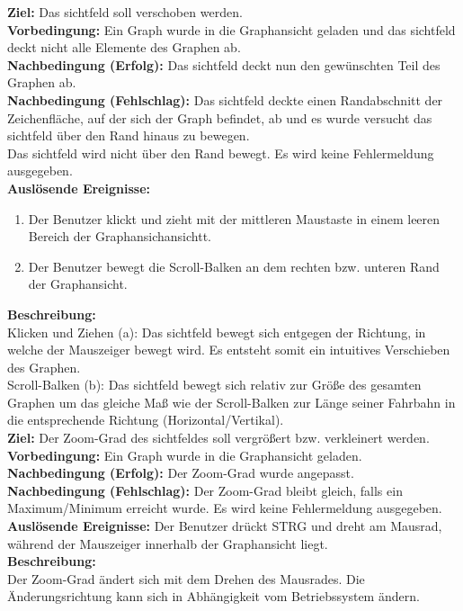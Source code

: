\label{fa:verschieben}
\textbf{Ziel:} Das \gls{sichtfeld} soll verschoben werden.\\
\textbf{Vorbedingung:} Ein Graph wurde in die Graphansicht geladen und das \gls{sichtfeld} deckt nicht alle Elemente des Graphen ab.\\
\textbf{Nachbedingung (Erfolg):}  Das \gls{sichtfeld} deckt nun den gewünschten Teil des Graphen ab.\\
\textbf{Nachbedingung (Fehlschlag):} Das \gls{sichtfeld} deckte einen Randabschnitt der Zeichenfläche, auf der sich der Graph befindet, ab und es wurde versucht das \gls{sichtfeld} über den Rand hinaus zu bewegen.\\
Das \gls{sichtfeld} wird nicht über den Rand bewegt. Es wird keine Fehlermeldung ausgegeben.\\
\textbf{Auslösende Ereignisse:}
\begin{enumerate}[nolistsep, label=(\alph*)]
  \item Der Benutzer klickt und zieht mit der mittleren Maustaste in einem leeren Bereich der Graphansichansichtt.
  \item Der Benutzer bewegt die Scroll-Balken an dem rechten bzw. unteren Rand der Graphansicht. %
\end{enumerate}
\textbf{Beschreibung:}\\
Klicken und Ziehen (a): Das \gls{sichtfeld} bewegt sich entgegen der Richtung, in welche der Mauszeiger bewegt wird. Es entsteht somit ein intuitives Verschieben des Graphen.\\
Scroll-Balken (b): Das \gls{sichtfeld} bewegt sich relativ zur Größe des gesamten Graphen um das gleiche Maß wie der Scroll-Balken zur Länge seiner Fahrbahn in die entsprechende Richtung (Horizontal/Vertikal).\\

\label{fa:zoom}
\textbf{Ziel:} Der Zoom-Grad des \gls{sichtfeld}es soll vergrößert bzw. verkleinert werden.\\
\textbf{Vorbedingung:} Ein Graph wurde in die Graphansicht geladen.\\
\textbf{Nachbedingung (Erfolg):} Der Zoom-Grad wurde angepasst.\\
\textbf{Nachbedingung (Fehlschlag):} Der Zoom-Grad bleibt gleich, falls ein Maximum/Minimum erreicht wurde. Es wird keine Fehlermeldung ausgegeben.\\
\textbf{Auslösende Ereignisse:} Der Benutzer drückt STRG und dreht am Mausrad, während der Mauszeiger innerhalb der Graphansicht liegt.\\
\textbf{Beschreibung:}\\
Der Zoom-Grad ändert sich mit dem Drehen des Mausrades. Die Änderungsrichtung kann sich in Abhängigkeit vom Betriebssystem ändern.\\

